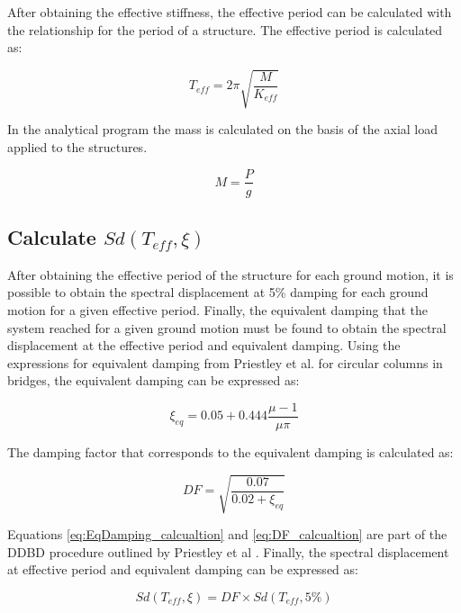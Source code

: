 After obtaining the effective stiffness, the effective period can be calculated with the relationship for the period of a structure. The effective period is calculated as:

\begin{equation}
     T_{eff}=2\pi \sqrt{\frac{M}{K_{eff}}}
    \label{eq:Teff_calcualtion}
\end{equation}

In the analytical program the mass is calculated on the basis of the axial load applied to the structures. 

\begin{equation}
    M=\frac{P}{g}
    \label{eq:M_calcualtion}
\end{equation}

\subsection{Calculate $Sd(T_{eff},\xi)$}

After obtaining the effective period of the structure for each ground motion, it is possible to obtain the spectral displacement at 5\% damping for each ground motion for a given effective period. Finally, the equivalent damping that the system reached for a given ground motion must be found to obtain the spectral displacement at the effective period and equivalent damping. Using the expressions for equivalent damping from Priestley et al. for circular columns in bridges, the equivalent damping can be expressed as:

\begin{equation}
    \xi_{eq}=0.05+0.444\frac{\mu-1}{\mu\pi}
    \label{eq:EqDamping_calcualtion}
\end{equation}

The damping factor that corresponds to the equivalent damping is calculated as:

\begin{equation}
    DF=\sqrt{\frac{0.07}{0.02+\xi_{eq}}}
    \label{eq:DF_calcualtion}
\end{equation}

Equations \ref{eq:EqDamping_calcualtion} and \ref{eq:DF_calcualtion} are part of the DDBD procedure outlined by Priestley et al \cite{Priestley2007}. Finally, the spectral displacement at effective period and equivalent damping can be expressed as:

\begin{equation}
    Sd(T_{eff},\xi)=DF \times Sd(T_{eff},5\%)
    \label{eq:Sd_teff_xi_calcualtion}
\end{equation}

